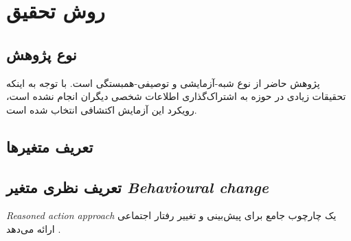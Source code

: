 \chapter{روش تحقیق}
\section{نوع پژوهش}
پژوهش حاضر از نوع شبه-آزمایشی و توصیفی-همبستگی است. با توجه به اینکه تحقیقات زیادی در حوزه به اشتراک‌گذاری اطلاعات شخصی دیگران 
انجام نشده است، رویکرد این آزمایش اکتشافی انتخاب شده است.
\section{تعریف متغیر‌ها}


\section*{تعریف نظری متغیر
    \textit{
        \gls{Behavioural change}
    }
    }
    \textit{
        \gls{Reasoned action approach}
    }
یک چارچوب جامع برای پیش‌بینی و تغییر رفتار اجتماعی ارائه می‌دهد
\citep{goldReviewPredictingChanging2011,fishbeinPredictingChangingBehavior2015}. 

